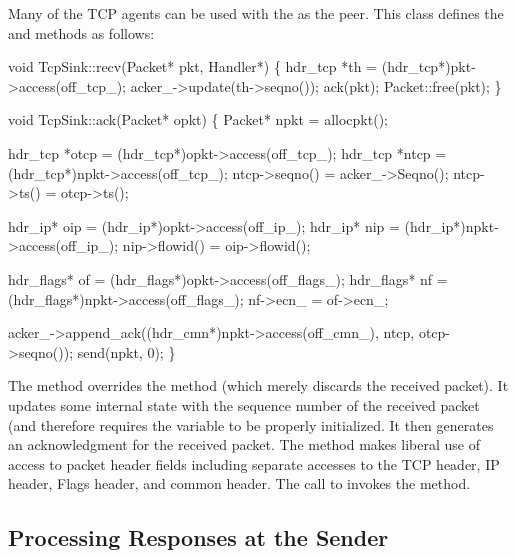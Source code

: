 Many of the TCP agents can be used with the
 as the peer.
This class defines the  and  methods as follows:
\begin{program}
        void TcpSink::recv(Packet* pkt, Handler*)
        \{
                hdr_tcp *th = (hdr_tcp*)pkt->access(off_tcp_);
                acker_->update(th->seqno());
                ack(pkt);
                Packet::free(pkt);
        \}

        void TcpSink::ack(Packet* opkt)
        \{
                Packet* npkt = allocpkt();
        
                hdr_tcp *otcp = (hdr_tcp*)opkt->access(off_tcp_);
                hdr_tcp *ntcp = (hdr_tcp*)npkt->access(off_tcp_);
                ntcp->seqno() = acker_->Seqno();
                ntcp->ts() = otcp->ts();
        
                hdr_ip* oip = (hdr_ip*)opkt->access(off_ip_);
                hdr_ip* nip = (hdr_ip*)npkt->access(off_ip_);
                nip->flowid() = oip->flowid();
        
                hdr_flags* of = (hdr_flags*)opkt->access(off_flags_);
                hdr_flags* nf = (hdr_flags*)npkt->access(off_flags_);
                nf->ecn_ = of->ecn_;
        
                acker_->append_ack((hdr_cmn*)npkt->access(off_cmn_),
                                   ntcp, otcp->seqno());
                send(npkt, 0);
        \}
\end{program}
The  method overrides the  method
(which merely discards the received packet).
It updates some internal state with the sequence number of the
received packet (and therefore requires the  variable
to be properly initialized.
It then generates an acknowledgment for the received packet.
The  method makes liberal use of access to packet header
fields including separate accesses to the TCP header, IP header,
Flags header, and common header.
The call to  invokes the  method.

\subsection{Processing Responses at the Sender}
\label{sec:tcpsimpleack}

